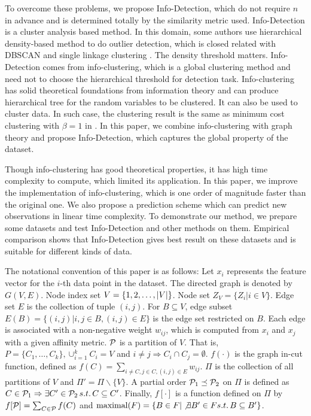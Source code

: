 \documentclass[runningheads]{llncs}
\begin{document}
To overcome these problems, we propose Info-Detection, which do not require $n$ in advance and is determined totally by the similarity metric used.  
Info-Detection is a cluster analysis based method. In this domain, some authors use hierarchical density-based method to do outlier detection, which is closed related with DBSCAN and single linkage clustering \cite{Campello}. The density threshold matters. Info-Detection comes from info-clustering, which is a global clustering method \cite{RN1} and need not to choose the hierarchical threshold for detection task. Info-clustering has solid theoretical foundations from information theory and can produce hierarchical tree for the random variables to be clustered. It can also be used to cluster data. In such case, the clustering result is the same as minimum cost clustering with $\beta = 1$ in \cite{RN7}. In this paper, we combine info-clustering with graph theory and propose Info-Detection, which captures the global property of the dataset.  

Though info-clustering has good theoretical properties, it has high time complexity to compute, which limited its application. In this paper, we improve the implementation of info-clustering, which is one order of magnitude faster than the original one. We also propose a prediction scheme which can predict new observations in linear time complexity. To demonstrate our method, we prepare some datasets and test Info-Detection and other methods on them. Empirical comparison shows that Info-Detection gives best result on these datasets and is suitable for different kinds of data. 

The notational convention of this paper is as follows: Let $x_i$ represents the feature vector for the $i$-th data point in the dataset. The directed graph is denoted by $G(V, E)$. Node index set $V=\{1, 2,\dots, \abs{V}\}$. Node set $Z_V=\{Z_i | i \in V\}$. Edge set $E$ is the collection of tuple $(i,j)$. For $B\subseteq V$, edge subset $E(B) = \{(i,j)| i, j \in B,(i,j)\in E\}$ is the edge set restricted on $B$. Each edge is associated with a non-negative weight $w_{ij}$, which is computed from $x_i$ and $x_j$ with a given affinity metric. $\P$ is a partition of $V$. That is, $P=\{C_1, \dots, C_k\}, \cup_{i=1}^k C_i=V$ and $i\neq j \Rightarrow C_i \cap C_j =\emptyset $. $f(\cdot)$ is the graph in-cut function, defined as $f(C)=\sum_{i \neq C, j\in C, (i,j) \in E} w_{ij}$. $\Pi$ is the collection of all partitions of $V$ and $\Pi'=\Pi\backslash\{V\}$. A partial order $ \P_1 \preceq \P_2$ on $\Pi$ is defined as
$C \in \P_1 \Rightarrow \exists C' \in \P_2 \, s.t. \, C \subseteq C'$.
Finally, $f[\cdot]$ is a function defined on $\Pi$ by $f[\P]=\sum_{C\in \P}f(C)$ and $\textrm{maximal} (F)=\{B\in F | \not\exists B' \in F s.t.\, B \subseteq B'\}$.
\end{document}
